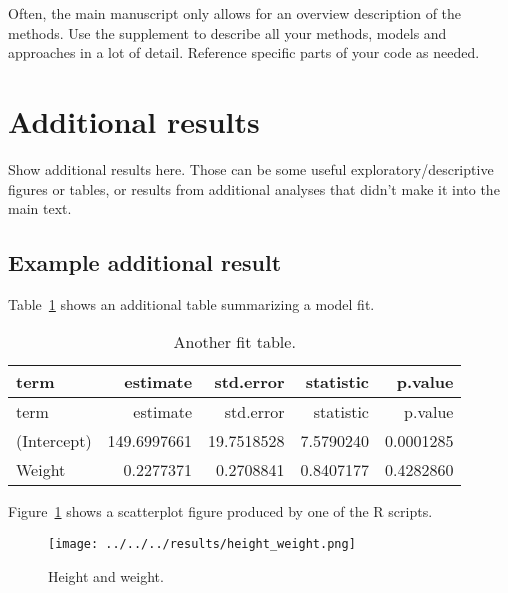 \documentclass[
  letterpaper,
  DIV=11,
  numbers=noendperiod]{scrartcl}
\begin{document}
Often, the main manuscript only allows for an overview description of
the methods. Use the supplement to describe all your methods, models and
approaches in a lot of detail. Reference specific parts of your code as
needed.

\newpage{}

\hypertarget{additional-results}{%
\section{Additional results}\label{additional-results}}

Show additional results here. Those can be some useful
exploratory/descriptive figures or tables, or results from additional
analyses that didn't make it into the main text.

\hypertarget{example-additional-result}{%
\subsection{Example additional result}\label{example-additional-result}}

Table~\ref{tbl-resulttable1} shows an additional table summarizing a
model fit.

\hypertarget{tbl-resulttable1}{}
\begin{longtable}[]{@{}lrrrr@{}}
\caption{\label{tbl-resulttable1}Another fit table.}\tabularnewline
\toprule()
term & estimate & std.error & statistic & p.value \\
\midrule()
\endfirsthead
\toprule()
term & estimate & std.error & statistic & p.value \\
\midrule()
\endhead
(Intercept) & 149.6997661 & 19.7518528 & 7.5790240 & 0.0001285 \\
Weight & 0.2277371 & 0.2708841 & 0.8407177 & 0.4282860 \\
\bottomrule()
\end{longtable}

Figure~\ref{fig-result2} shows a scatterplot figure produced by one of
the R scripts.

\begin{figure}

{\centering \texttt{[image: ../../../results/height\_weight.png]}

}

\caption{\label{fig-result2}Height and weight.}

\end{figure}

\newpage{}
\end{document}
